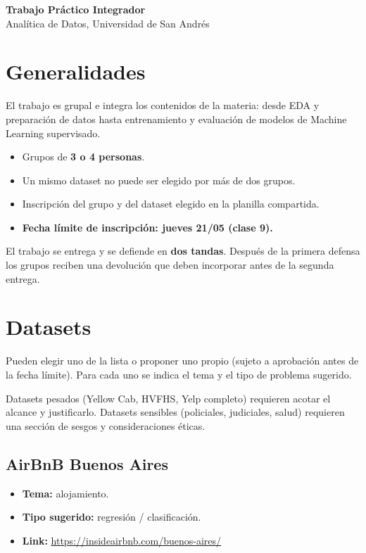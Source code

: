 \documentclass[12pt]{article}
\begin{document}
\begin{center}
  {\LARGE \textbf{Trabajo Práctico Integrador}}\\[0.5em]
  {Analítica de Datos, Universidad de San Andrés}
\end{center}

\section{Generalidades}

El trabajo es grupal e integra los contenidos de la materia: desde EDA y preparación de datos hasta entrenamiento y evaluación de modelos de Machine Learning supervisado.

\begin{itemize}
    \item Grupos de \textbf{3 o 4 personas}.
    \item Un mismo dataset no puede ser elegido por más de dos grupos.
    \item Inscripción del grupo y del dataset elegido en la planilla compartida.
    \item \textbf{Fecha límite de inscripción: jueves 21/05 (clase 9).}
\end{itemize}

El trabajo se entrega y se defiende en \textbf{dos tandas}. Después de la primera defensa los grupos reciben una devolución que deben incorporar antes de la segunda entrega.

\section{Datasets}

Pueden elegir uno de la lista o proponer uno propio (sujeto a aprobación antes de la fecha límite). Para cada uno se indica el tema y el tipo de problema sugerido.

Datasets pesados (Yellow Cab, HVFHS, Yelp completo) requieren acotar el alcance y justificarlo. Datasets sensibles (policiales, judiciales, salud) requieren una sección de sesgos y consideraciones éticas.

\subsection{AirBnB Buenos Aires}
\begin{itemize}
    \item \textbf{Tema:} alojamiento.
    \item \textbf{Tipo sugerido:} regresión / clasificación.
    \item \textbf{Link:} \url{https://insideairbnb.com/buenos-aires/}
\end{itemize}
\end{document}
